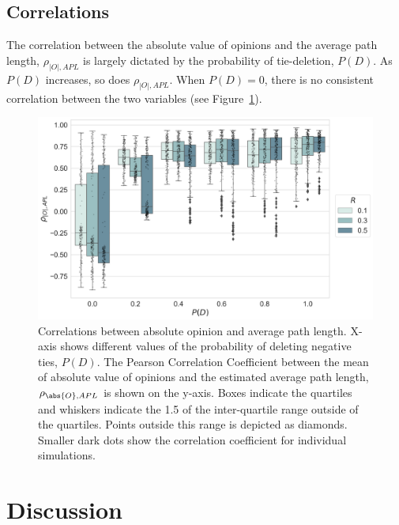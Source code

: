 \documentclass[11pt]{article}
\DeclarePairedDelimiter{\abs}\lvert\rvert
\begin{document}
\subsection{Correlations}
The correlation between the absolute value of opinions and the average path length, $\rho_{|O|, APL}$ is largely dictated by the probability of tie-deletion, $P(D)$. As $P(D)$ increases, so does $\rho_{|O|, APL}$. When $P(D) = 0$, there is no consistent correlation between the two variables (see Figure~\ref{fig:corr_abs_path}). 

\begin{figure}[H]
    \centering
    \includegraphics[width=.98\linewidth]{../plots/overall/Tie_Dissolution_Correlations_Boxplot_Full.png}
  \caption{Correlations between absolute opinion and average path length. X-axis shows different values of the probability of deleting negative ties, $P(D)$. The Pearson Correlation Coefficient between the mean of absolute value of opinions and the estimated average path length, $\rho_{\abs{O}, APL}$ is shown on the y-axis. Boxes indicate the quartiles and whiskers indicate the 1.5 of the inter-quartile range outside of the quartiles. Points outside this range is depicted as diamonds. Smaller dark dots show the correlation coefficient for individual simulations.}
  \label{fig:corr_abs_path}
\end{figure}

\section{Discussion}
\end{document}
